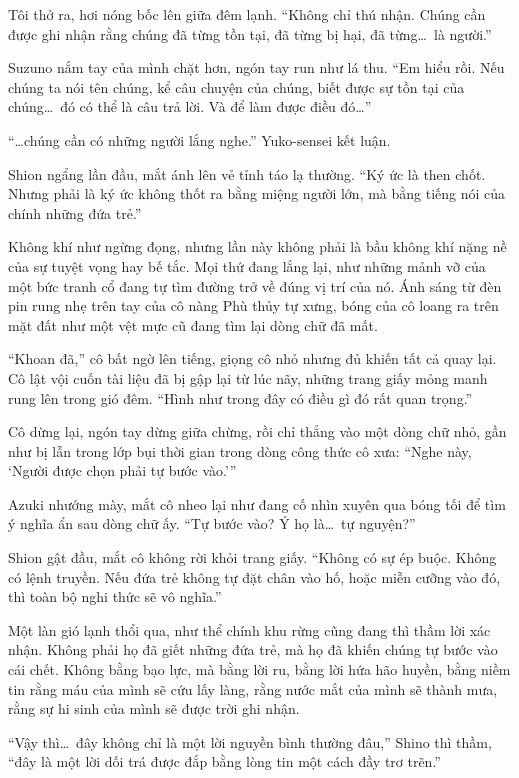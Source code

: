 \documentclass[../main.tex]{subfiles}
\begin{document}
Tôi thở ra, hơi nóng bốc lên giữa đêm lạnh. ``Không chỉ thú nhận. Chúng cần được ghi nhận rằng chúng đã từng tồn tại, đã từng bị hại, đã từng\dots\ là người.''

Suzuno nắm tay của mình chặt hơn, ngón tay run như lá thu. ``Em hiểu rồi. Nếu chúng ta nói tên chúng, kể câu chuyện của chúng, biết được sự tồn tại của chúng\dots\ đó có thể là câu trả lời. Và để làm được điều đó\dots''

``\dots chúng cần có những người lắng nghe.'' Yuko-sensei kết luận.

Shion ngẩng lần đầu, mắt ánh lên vẻ tỉnh táo lạ thường. ``Ký ức là then chốt. Nhưng phải là ký ức không thốt ra bằng miệng người lớn, mà bằng tiếng nói của chính những đứa trẻ.''

Không khí như ngừng đọng, nhưng lần này không phải là bầu không khí nặng nề của sự tuyệt vọng hay bế tắc. Mọi thứ đang lắng lại, như những mảnh vỡ của một bức tranh cổ đang tự tìm đường trở về đúng vị trí của nó. Ánh sáng từ đèn pin rung nhẹ trên tay của cô nàng Phù thủy tự xưng, bóng của cô loang ra trên mặt đất như một vệt mực cũ đang tìm lại dòng chữ đã mất.

``Khoan đã,'' cô bất ngờ lên tiếng, giọng cô nhỏ nhưng đủ khiến tất cả quay lại. Cô lật vội cuốn tài liệu đã bị gập lại từ lúc nãy, những trang giấy mỏng manh rung lên trong gió đêm. ``Hình như trong đây có điều gì đó rất quan trọng.''

Cô dừng lại, ngón tay dừng giữa chừng, rồi chỉ thẳng vào một dòng chữ nhỏ, gần như bị lẫn trong lớp bụi thời gian trong dòng công thức cô xưa: ``Nghe này, `Người được chọn phải tự bước vào.'''

Azuki nhướng mày, mắt cô nheo lại như đang cố nhìn xuyên qua bóng tối để tìm ý nghĩa ẩn sau dòng chữ ấy. ``Tự bước vào? Ý họ là\dots\ tự nguyện?''

Shion gật đầu, mắt cô không rời khỏi trang giấy. ``Không có sự ép buộc. Không có lệnh truyền. Nếu đứa trẻ không tự đặt chân vào hố, hoặc miễn cưỡng vào đó, thì toàn bộ nghi thức sẽ vô nghĩa.''

Một làn gió lạnh thổi qua, như thể chính khu rừng cũng đang thì thầm lời xác nhận. Không phải họ đã giết những đứa trẻ, mà họ đã khiến chúng tự bước vào cái chết. Không bằng bạo lực, mà bằng lời ru, bằng lời hứa hão huyền, bằng niềm tin rằng máu của mình sẽ cứu lấy làng, rằng nước mắt của mình sẽ thành mưa, rằng sự hi sinh của mình sẽ được trời ghi nhận.

``Vậy thì\dots\ đây không chỉ là một lời nguyền bình thường đâu,'' Shino thì thầm, ``đây là một lời dối trá được đắp bằng lòng tin một cách đầy trơ trẽn.''
\end{document}
